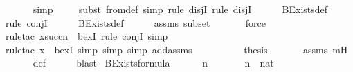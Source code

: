 \begin{isabellebody}
\ \ \ \ \isamarkupfalse%
\ simp\isanewline
\ \ \ \ \isamarkupfalse%
{\isacharparenleft}{\kern0pt}subst\ {\isasymDelta}{}{\isacharunderscore}{\kern0pt}from{\isacharunderscore}{\kern0pt}def{\isacharcomma}{\kern0pt}\ simp{\isacharcomma}{\kern0pt}\ rule\ disjI{}{\isacharcomma}{\kern0pt}\ rule\ disjI{}{\isacharparenright}{\kern0pt}\isanewline
\ \ \ \ \isamarkupfalse%
\ BExists{\isacharunderscore}{\kern0pt}def\isanewline
\ \ \ \ \isamarkupfalse%
{\isacharparenleft}{\kern0pt}rule\ conjI{\isacharparenright}{\kern0pt}\isanewline
\ \ \ \ \isamarkupfalse%
\ BExists{\isacharprime}{\kern0pt}{\isacharunderscore}{\kern0pt}def\isanewline
\ \ \ \ \isamarkupfalse%
\ assms\ {\isasymDelta}{}{\isacharunderscore}{\kern0pt}subset\isanewline
\ \ \ \ \ \isamarkupfalse%
\ force\isanewline
\ \ \ \ \isamarkupfalse%
{\isacharparenleft}{\kern0pt}rule{\isacharunderscore}{\kern0pt}tac\ x{\isacharequal}{\kern0pt}{\isachardoublequoteopen}succ{\isacharparenleft}{\kern0pt}n{\isacharparenright}{\kern0pt}{\isachardoublequoteclose}\ \ bexI{\isacharcomma}{\kern0pt}\ rule\ conjI{\isacharcomma}{\kern0pt}\ simp{\isacharparenright}{\kern0pt}\isanewline
\ \ \ \ \ \isamarkupfalse%
{\isacharparenleft}{\kern0pt}rule{\isacharunderscore}{\kern0pt}tac\ x{\isacharequal}{\kern0pt}{\isachardoublequoteopen}{\isasymphi}{\isachardoublequoteclose}\ \ bexI{\isacharcomma}{\kern0pt}\ simp{\isacharcomma}{\kern0pt}\ simp{\isacharcomma}{\kern0pt}\ simp\ add{\isacharcolon}{\kern0pt}assms{\isacharparenright}{\kern0pt}\isanewline
\ \ \ \ \isamarkupfalse%
\isanewline
\ \ \isamarkupfalse%
\ \isamarkupfalse%
\ {\isacharquery}{\kern0pt}thesis\ \isanewline
\ \ \ \ \isamarkupfalse%
\ assms\ mH\isanewline
\ \ \ \ \isamarkupfalse%
\ {\isasymDelta}{}{\isacharunderscore}{\kern0pt}def\isanewline
\ \ \ \ \isamarkupfalse%
\ blast\isanewline
{}\isamarkupfalse%
%
\endisatagproof
{\isafoldproof}%
%
\isadelimproof
\isanewline
%
\endisadelimproof
\isanewline
{}\isamarkupfalse%
\ BExists{\isacharunderscore}{\kern0pt}formula\ {\isacharcolon}{\kern0pt}\ \isanewline
\ \ \ {\isasymphi}\ n\ \isanewline
\ \ \ {\isachardoublequoteopen}{\isasymphi}\ {\isasymin}\ {\isasymDelta}{}{\isachardoublequoteclose}\ {\isachardoublequoteopen}n\ {\isasymin}\ nat{\isachardoublequoteclose}\ \isanewline

\end{isabellebody}
